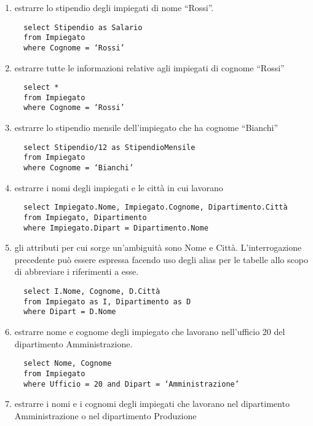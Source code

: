 \documentclass[a4paper]{article}
\begin{document}
\begin{enumerate}
  \item estrarre lo stipendio degli impiegati di nome “Rossi”.
  \begin{verbatim}
  select Stipendio as Salario
  from Impiegato
  where Cognome = ‘Rossi’
  \end{verbatim}\par   \item estrarre tutte le informazioni relative agli impiegati di cognome “Rossi”
  \begin{verbatim}
  select *
  from Impiegato
  where Cognome = ‘Rossi’
  \end{verbatim}\par   \item estrarre lo stipendio mensile dell’impiegato che ha cognome “Bianchi”
  \begin{verbatim}
  select Stipendio/12 as StipendioMensile
  from Impiegato
  where Cognome = ‘Bianchi’
  \end{verbatim}\par   \item estrarre i nomi degli impiegati e le città in cui lavorano
  \begin{verbatim}
  select Impiegato.Nome, Impiegato.Cognome, Dipartimento.Città
  from Impiegato, Dipartimento
  where Impiegato.Dipart = Dipartimento.Nome
  \end{verbatim}\par   \item gli attributi per cui sorge un'ambiguità sono Nome e Città. L'interrogazione precedente può essere espressa facendo uso degli alias per le tabelle allo scopo di abbreviare i riferimenti a esse.
  \begin{verbatim}
  select I.Nome, Cognome, D.Città
  from Impiegato as I, Dipartimento as D
  where Dipart = D.Nome
  \end{verbatim}\par   \item estrarre nome e cognome degli impiegato che lavorano nell’ufficio 20 del dipartimento Amministrazione.
  \begin{verbatim}
  select Nome, Cognome
  from Impiegato
  where Ufficio = 20 and Dipart = ‘Amministrazione’
  \end{verbatim}\par   \item estrarre i nomi e i cognomi degli impiegati che lavorano nel dipartimento Amministrazione o nel dipartimento Produzione
  \begin{verbatim}

\end{verbatim}
\end{enumerate}
\end{document}
